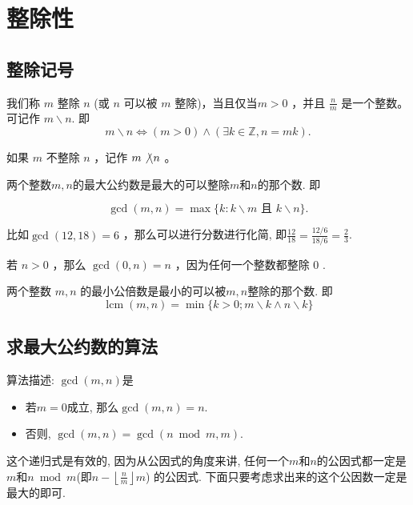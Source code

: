 \documentclass{ctexart}
\newcommand{\bzc}{\not\backslash}
\begin{document}
\section{整除性}

\subsection{整除记号}

\begin{definition}
    我们称 $m$ 整除 $n$ (或 $n$ 可以被 $m$ 整除)，当且仅当$m>0$ ，并且 $\frac{n}{m}$ 是一个整数。可记作 $m \backslash n$. 即
$$
m \backslash n \Leftrightarrow(m>0) \wedge(\exists k \in \mathbb{Z}, n=m k) .
$$

如果 $m$ 不整除 $n$ ，记作 $m \bzc n$ 。

\end{definition}

\begin{definition}[最大公约数]
    两个整数$m, n$的最大公约数是最大的可以整除$m$和$n$的那个数. 即

    $$
\operatorname{gcd}(m, n)=\max \{k: k \backslash m \text { 且 } k \backslash n\} .
$$
\end{definition}

比如$\operatorname{gcd}(12,18)=6$ ，那么可以进行分数进行化简, 即$\frac{12}{18}=\frac{12 / 6}{18/6}=\frac{2}{3}$.

\begin{remark}
    若 $n>0$ ，那么 $\operatorname{gcd}(0, n)=n$ ，因为任何一个整数都整除 0 .
\end{remark}

\begin{definition}[最小公倍数]
    两个整数 $m,n$ 的最小公倍数是最小的可以被$m,n$整除的那个数. 即
    $$
\operatorname{lcm}(m, n)=\min \{k>0 ; m \backslash k \wedge n \backslash k\}
$$
\end{definition}

\subsection{求最大公约数的算法}

算法描述: $\gcd(m,n)$是
\begin{itemize}
    \item 若$m=0$成立, 那么$\gcd(m,n)=n$.
    \item 否则, $\gcd(m,n)=\gcd(n \bmod m, m)$.
\end{itemize}

这个递归式是有效的, 因为从公因式的角度来讲, 任何一个$m$和$n$的公因式都一定是$m$和$n \bmod m$(即$n-\left\lfloor\frac{n}{m}\right\rfloor m$) 的公因式. 下面只要考虑求出来的这个公因数一定是最大的即可. 
\end{document}
